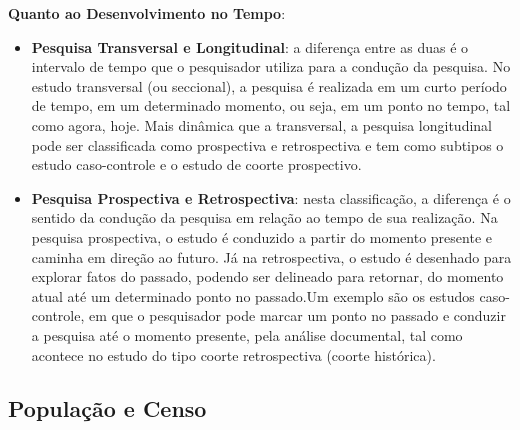 \textbf{Quanto ao Desenvolvimento no Tempo}: 

\begin{itemize}
\item \textbf{Pesquisa Transversal e Longitudinal}: a diferença entre as duas é o intervalo de tempo que o pesquisador utiliza para a condução da pesquisa. No estudo transversal (ou seccional), a pesquisa é realizada em um curto período de tempo, em um determinado momento, ou seja, em um ponto no tempo, tal como agora, hoje. Mais dinâmica que a transversal, a pesquisa longitudinal pode ser classificada como prospectiva e retrospectiva e tem como subtipos o estudo caso-controle e o estudo de coorte prospectivo. 

\newpage
\item \textbf{Pesquisa Prospectiva e Retrospectiva}: nesta classificação, a diferença é o sentido da condução da pesquisa em relação ao tempo de sua realização. Na pesquisa prospectiva, o estudo é conduzido a partir do momento presente e caminha em direção ao futuro. Já na retrospectiva, o estudo é desenhado para explorar fatos do passado, podendo ser delineado para retornar, do momento atual até um determinado ponto no passado.Um exemplo são os estudos caso-controle, em que o pesquisador pode marcar um ponto no passado e conduzir a pesquisa até o momento presente, pela  análise documental, tal como acontece no estudo do tipo coorte retrospectiva (coorte histórica). 
\end{itemize}

\subsection{População e Censo}

